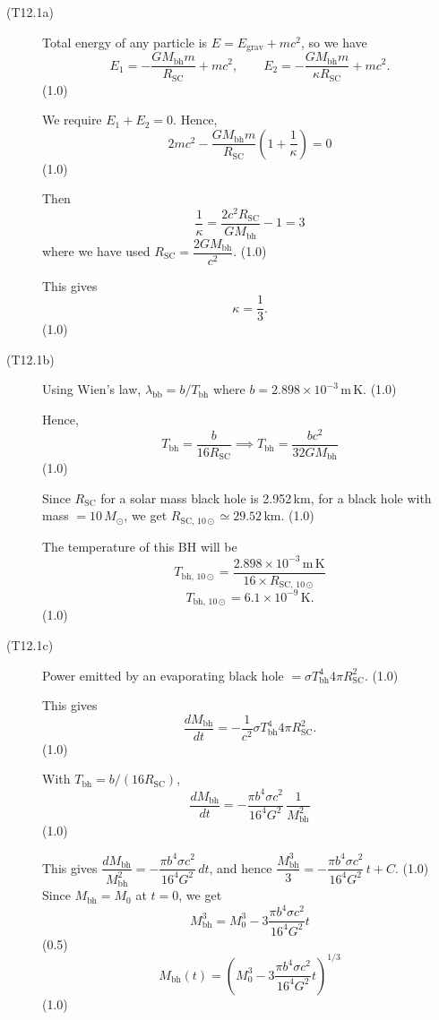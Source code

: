 \begin{description}
\item[(T12.1a)] Total energy of any particle is
  $E = E_{\mathrm{grav}} + mc^2$, so we have
  \[
    E_1 = -\frac{G M_{\mathrm{bh}} m}{R_{\mathrm{SC}}} + mc^2, \qquad
    E_2 = -\frac{G M_{\mathrm{bh}} m}{\kappa R_{\mathrm{SC}}} + mc^2.
  \]
  \hfill(1.0)

  We require $E_1 + E_2 = 0$. Hence,
  \[
    2mc^2 - \frac{G M_{\mathrm{bh}} m}{R_{\mathrm{SC}}}
    \left(1 + \frac{1}{\kappa}\right) = 0
  \]
  \hfill(1.0)

  Then
  \[
    \frac{1}{\kappa} = \frac{2 c^2 R_{\mathrm{SC}}}{G M_{\mathrm{bh}}} - 1 = 3
  \]
  where we have used
  $R_{\mathrm{SC}} = \dfrac{2 G M_{\mathrm{bh}}}{c^2}$. \hfill(1.0)

  This gives
  \[
    \kappa = \frac{1}{3}.
  \]
  \hfill(1.0)

\item[(T12.1b)] Using Wien's law,
  $\lambda_{\mathrm{bb}} = b/T_{\mathrm{bh}}$ where
  $b = 2.898 \times 10^{-3}$\,m\,K. \hfill(1.0)

  Hence,
  \[
    T_{\mathrm{bh}} = \frac{b}{16 R_{\mathrm{SC}}}
    \implies T_{\mathrm{bh}} = \frac{b c^2}{32 G M_{\mathrm{bh}}}
  \]
  \hfill(1.0)

  Since $R_{\mathrm{SC}}$ for a solar mass black hole is 2.952\,km, for a
  black hole with mass $= 10\,M_\odot$, we get
  $R_{\mathrm{SC,\,10\odot}} \simeq 29.52$\,km. \hfill(1.0)

  The temperature of this BH will be
  \[
    T_{\mathrm{bh,\,10\odot}}
    = \frac{2.898 \times 10^{-3}\,\mathrm{m\,K}}{16 \times
      R_{\mathrm{SC,\,10\odot}}}
  \]
  \[
    T_{\mathrm{bh,\,10\odot}} = 6.1 \times 10^{-9}\,\mathrm{K}.
  \]
  \hfill(1.0)

\item[(T12.1c)] Power emitted by an evaporating black hole
  $= \sigma T_{\mathrm{bh}}^4 4\pi R_{\mathrm{SC}}^2$. \hfill(1.0)

  This gives
  \[
    \frac{dM_{\mathrm{bh}}}{dt}
    = -\frac{1}{c^2}\sigma T_{\mathrm{bh}}^4 4\pi R_{\mathrm{SC}}^2.
  \]
  \hfill(1.0)

  With $T_{\mathrm{bh}} = b/(16 R_{\mathrm{SC}})$,
  \[
    \frac{dM_{\mathrm{bh}}}{dt}
    = -\frac{\pi b^4 \sigma c^2}{16^4 G^2}\,\frac{1}{M_{\mathrm{bh}}^2}
  \]
  \hfill(1.0)

  This gives
  $\dfrac{dM_{\mathrm{bh}}}{M_{\mathrm{bh}}^{2}}
  = -\dfrac{\pi b^4 \sigma c^2}{16^4 G^2}\,dt$,
  and hence
  $\dfrac{M_{\mathrm{bh}}^3}{3}
  = -\dfrac{\pi b^4 \sigma c^2}{16^4 G^2}\,t + C$. \hfill(1.0)
  Since $M_{\mathrm{bh}} = M_0$ at $t = 0$, we get
  \[
    M_{\mathrm{bh}}^3 = M_0^3 - 3\frac{\pi b^4 \sigma c^2}{16^4 G^2} t
  \]
  \hfill(0.5)
  \[
    M_{\mathrm{bh}}(t)
    = \left(M_0^3 - 3\frac{\pi b^4 \sigma c^2}{16^4 G^2} t\right)^{1/3}
  \]
  \hfill(1.0)


\end{description}
